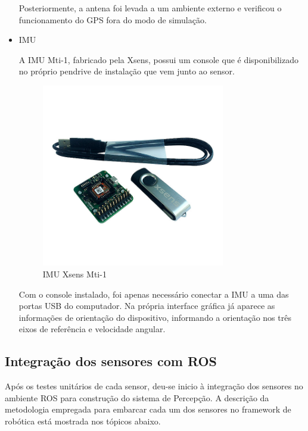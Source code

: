 \begin{itemize}
		Posteriormente, a antena foi levada a um ambiente externo e verificou o funcionamento do GPS fora do modo de simulação.    
		
		\item IMU
		
		A IMU Mti-1, fabricado pela Xsens, possui um console que é disponibilizado no próprio pendrive de instalação que vem junto ao sensor.
		
		\begin{figure}[!ht]
			\centering
			\includegraphics[width=8cm]{Figures/imu.jpg}
			\caption{IMU Xsens Mti-1}
			\label{fig:IMU}
		\end{figure}
		
		Com o console instalado, foi apenas necessário conectar a IMU a uma das portas USB do computador. Na própria interface gráfica já aparece as informações de orientação do dispositivo, informando a orientação nos três eixos de referência e velocidade angular.
	\end{itemize}
	
		\subsection{Integração dos sensores com ROS}
		\label{sec:rosinte}
		
		Após os testes unitários de cada sensor, deu-se inicio à integração dos sensores no ambiente ROS para construção do sistema de Percepção. A descrição da metodologia empregada para embarcar cada um dos sensores no framework de robótica está mostrada nos tópicos abaixo.
		
